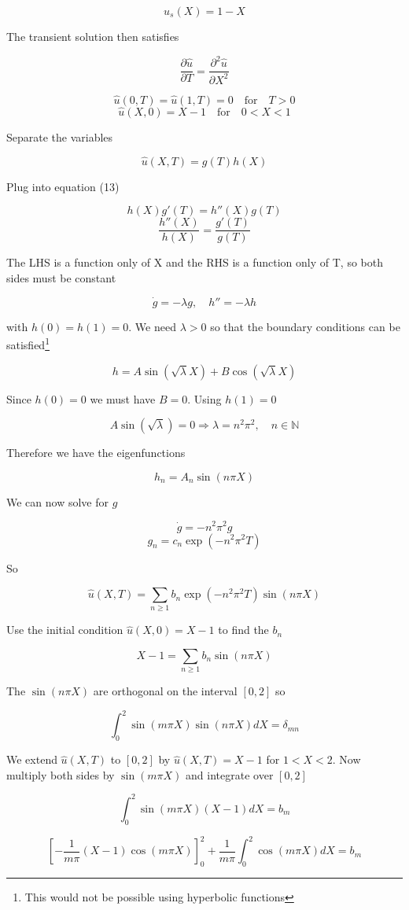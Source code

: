 \documentclass[12pt]{extarticle}
\begin{document}
$$u_s(X) = 1- X$$

The transient solution then satisfies

$$\frac{\partial \hat{u}}{\partial T} = \frac{\partial^2 \hat{u}}{\partial X^2}$$

$$\hat{u}(0,T) = \hat{u}(1,T) = 0 \quad \mathrm{for} \quad T>0$$
$$\hat{u}(X,0) = X-1 \quad \mathrm{for} \quad 0<X<1$$

Separate the variables

$$\hat{u}(X,T) = g(T)h(X)$$

Plug into equation (13)

$$h(X)g'(T) = h''(X)g(T)$$
$$\frac{h''(X)}{h(X)} = \frac{g'(T)}{g(T)}$$

The LHS is a function only of X and the RHS is a function only of T, so both sides must be constant

$$\dot{g} = -\lambda g, \quad h'' = -\lambda h$$

with $h(0)=h(1)=0$. We need $\lambda>0$ so that the boundary conditions can be satisfied\footnote{This would not be possible using hyperbolic functions}

$$h = A\sin(\sqrt{\lambda} X)+B\cos(\sqrt{\lambda} X)$$

Since $h(0) = 0$ we must have $B=0$. Using $h(1) = 0$

$$A\sin(\sqrt{\lambda}) = 0 \Rightarrow \lambda = n^2\pi^2, \quad n \in \mathbb{N}$$

Therefore we have the eigenfunctions 

$$h_n = A_n\sin(n\pi X)$$

We can now solve for $g$

$$\dot{g} = -n^2\pi^2 g$$
$$g_n = c_n\exp(-n^2\pi^2 T)$$

So 

$$\hat{u}(X,T) = \sum_{n \geq 1}b_n \exp(-n^2\pi^2 T)\sin(n\pi X) $$

Use the initial condition $\hat{u}(X,0) = X-1$ to find the $b_n$

$$X-1 = \sum_{n \geq 1}b_n \sin(n\pi X)$$

The $\sin(n\pi X)$ are orthogonal on the interval $[0,2]$ so

$$\int_0^2 \sin(m \pi X)\sin(n \pi X)dX = \delta_{mn}$$

We extend $\hat{u}(X,T)$ to $[0,2]$ by $\hat{u}(X,T) = X-1$ for $1<X<2$. Now multiply both sides by $\sin(m\pi X)$ and integrate over $[0,2]$

$$\int_0^2 \sin(m \pi X)(X-1) dX = b_m$$

$$\left[-\frac{1}{m\pi}(X-1)\cos(m\pi X)\right]_0^2+\frac{1}{m\pi}\int_0^2 \cos(m \pi X)dX = b_m$$
\end{document}
